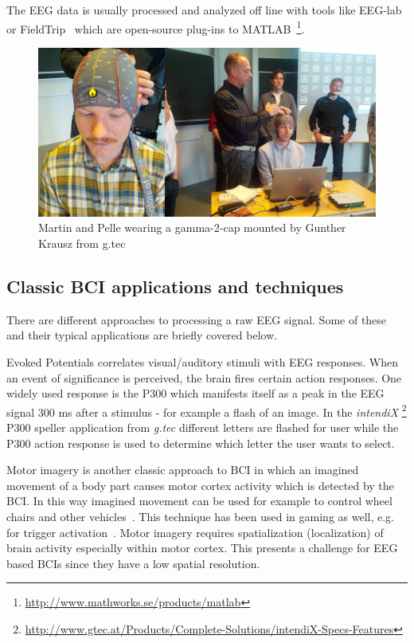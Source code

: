 \documentclass[a4paper,10pt,english,lof,lot,twoside]{puthesis}
\begin{document}
The EEG data is usually processed and analyzed off line with tools like EEG-lab \cite{delorme_eeglab:_2004} or FieldTrip \cite{oostenveld_fieldtrip:_2011} which are open-source plug-ins to MATLAB \footnote{
\href{http://www.mathworks.se/products/matlab}{http://www.mathworks.se/products/matlab}
}.
\begin{figure}[tbp]
\centering
\capstart

\includegraphics[width=0.700\linewidth]{gcap2_martin_pelle_collage.png}
\caption[Gamma-2-cap]{Martin and Pelle wearing a gamma-2-cap mounted by Gunther Krausz from g.tec}\label{ch-background/index:fig-bci-classic-cap-martin-pelle}\end{figure}


\subsection{Classic BCI applications and techniques}
\label{ch-background/index:classic-bci-applications-and-techniques}
There are different approaches to processing a raw EEG signal. Some of these and
their typical applications are briefly covered below.

Evoked Potentials correlates visual/auditory stimuli with EEG responses. When an
event of significance is perceived, the brain fires certain action
responses. One widely used response is the P300 which manifests itself as a peak
in the EEG signal 300 ms after a stimulus - for example a flash of an image. In
the \emph{intendiX} \footnote{
\href{http://www.gtec.at/Products/Complete-Solutions/intendiX-Specs-Features}{http://www.gtec.at/Products/Complete-Solutions/intendiX-Specs-Features}
} P300 speller application from
\emph{g.tec} different letters are flashed for user while the P300 action response is
used to determine which letter the user wants to select.

Motor imagery is another classic approach to BCI in which an imagined movement
of a body part causes motor cortex activity which is detected by the BCI. In
this way imagined movement can be used for example to control wheel chairs and
other vehicles \cite{mcfarland_brain-computer_2011}. This technique
has been used in gaming as well, e.g. for trigger activation \cite{coyle_eeg-based_2011}. Motor imagery requires spatialization
(localization) of brain activity especially within motor cortex. This
presents a challenge for EEG based BCIs since they have a low spatial
resolution.
\end{document}
